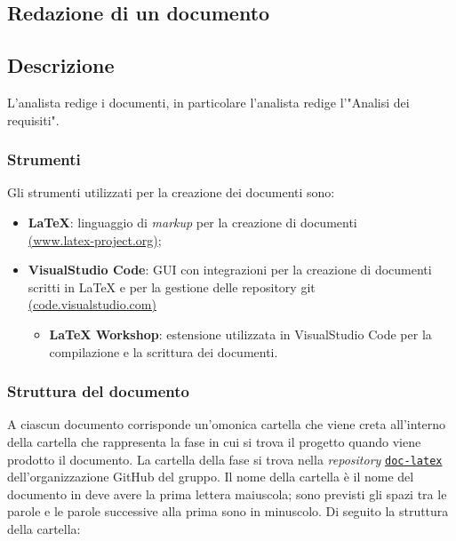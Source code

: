 \subsection{Redazione di un documento}
\label{redazione-documento}

\subsection{Descrizione}

L'analista redige i documenti, in particolare l'analista redige l'"Analisi dei
requisiti".

\subsubsection{Strumenti}
Gli strumenti utilizzati per la creazione dei documenti sono:
\begin{itemize}
	\item \textbf{LaTeX}: linguaggio di \textit{markup} per la creazione di documenti \\
	      \href{https://www.latex-project.org/}{(www.latex-project.org)};
	\item \textbf{VisualStudio Code}: GUI con integrazioni per la creazione di documenti scritti in LaTeX e per la gestione delle repository git \\
	      \href{https://code.visualstudio.com/}{(code.visualstudio.com)}
	      \begin{itemize}
		      \item \textbf{LaTeX Workshop}: estensione utilizzata in VisualStudio Code per la compilazione e la scrittura dei documenti.
	      \end{itemize}
\end{itemize}

\subsubsection{Struttura del documento}

A ciascun documento corrisponde un'omonica cartella che viene creta all'interno
della cartella che rappresenta la fase in cui si trova il progetto quando viene
prodotto il documento. La cartella della fase si trova nella \textit{repository}
\href{https://github.com/Project-SWEnergy/doc-latex}{\texttt{doc-latex}}
dell'organizzazione GitHub del gruppo.
Il nome della cartella è il nome del documento in deve avere la prima lettera
maiuscola; sono previsti gli spazi tra le parole e le parole successive alla
prima sono in minuscolo. Di seguito la struttura della cartella:


